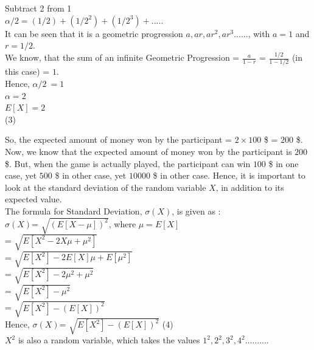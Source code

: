 \documentclass[a4paper]{article}
\begin{document}
Subtract 2 from 1 \\

$\alpha/2= (1/2)+(1/2^2)+(1/2^3)+.....$\\

It can be seen that it is a geometric progression $a,ar,ar^2,ar^3......$, with $a=1$ and $r=1/2$.\\

We know, that the sum of an infinite Geometric Progression = $\frac{a}{1-r}$ = $\frac{1/2}{1-1/2}$ (in this case) = $1$. \\

Hence, $\alpha/2\ = 1$\\

$\alpha=2$\\

$E[X]=2$\\  	(3)

So, the expected amount of money won by the participant = $2 \times 100$ \$ = $200$ \$.\\

Now, we know that the expected amount of money won by the participant is $200$ \$. But, when the game is actually played, the participant can win $100$ \$ in one case, yet $500$ \$ in other case, yet $10000$ \$ in other case. Hence, it is important to look at the standard deviation of the random variable $X$, in addition to its expected value.\\

The formula for Standard Deviation, $\sigma(X)$, is given as :\\ 

$\sigma(X)$= $ \sqrt{(E[X- \mu])^2} $, where $\mu = E[X]$\\


= $ \sqrt{E[X^2 - 2 X \mu + \mu ^ 2]} $\\

= $ \sqrt{E[X^2 ]- 2 E[X] \mu + E[\mu ^ 2]} $\\

= $ \sqrt{E[X^2 ]- 2 \mu^2 + \mu ^ 2} $\\

= $ \sqrt{E[X^2 ]- \mu ^ 2} $\\

= $ \sqrt{E[X^2 ]- (E[X]) ^ 2} $\\

Hence, $\sigma(X)$=  $ \sqrt{E[X^2 ]- (E[X]) ^ 2} $	(4)\\

$X^2$ is also a random variable, which takes the values $1^2, 2^2, 3^2, 4^2..........$\\
\end{document}
